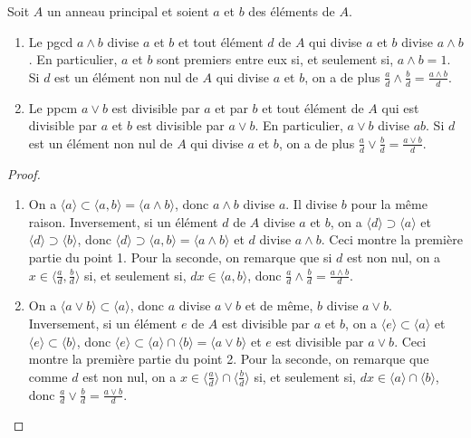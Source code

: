 \documentclass[]{report}
\begin{document}
\begin{prop}{}{}
    Soit $A$ un anneau principal et soient $a$ et $b$ des éléments de $A$.
    \begin{enumerate}
        \item Le pgcd $a \wedge b$ divise $a$ et $b$ et tout élément $d$ de $A$ qui divise $a$ et $b$ divise $a \wedge b$. En particulier, $a$ et $b$ sont premiers entre eux si, et seulement si, $a \wedge b = 1$. Si $d$ est un élément non nul de $A$ qui divise $a$ et $b$, on a de plus $\frac{a}{d} \wedge \frac{b}{d} = \frac{a \wedge b}{d}$.
        \item Le ppcm $a \vee b$ est divisible par $a$ et par $b$ et tout élément de $A$ qui est divisible par $a$ et $b$ est divisible par $a \vee b$. En particulier, $a \vee b$ divise $ab$. Si $d$ est un élément non nul de $A$ qui divise $a$ et $b$, on a de plus $\frac{a}{d} \vee \frac{b}{d} = \frac{a \vee b}{d}$.
    \end{enumerate}
\end{prop}

\begin{proof}
    \begin{enumerate}
        \item On a $\langle a \rangle \subset \langle a, b \rangle = \langle a \wedge b \rangle$, donc $a \wedge b$ divise $a$. Il divise $b$ pour la même raison. Inversement, si un élément $d$ de $A$ divise $a$ et $b$, on a $\langle d \rangle \supset \langle a \rangle$ et $\langle d \rangle \supset \langle b \rangle$, donc $\langle d \rangle \supset \langle a, b \rangle = \langle a \wedge b \rangle$ et $d$ divise $a \wedge b$. Ceci montre la première partie du point 1. Pour la seconde, on remarque que si $d$ est non nul, on a $x \in \langle \frac{a}{d}, \frac{b}{d} \rangle$ si, et seulement si, $dx \in \langle a, b \rangle$, donc $\frac{a}{d} \wedge \frac{b}{d} = \frac{a \wedge b}{d}$.
        \item On a $\langle a \vee b \rangle \subset \langle a \rangle$, donc $a$ divise $a \vee b$ et de même, $b$ divise $a \vee b$. Inversement, si un élément $e$ de $A$ est divisible par $a$ et $b$, on a $\langle e \rangle \subset \langle a \rangle$ et $\langle e \rangle \subset \langle b \rangle$, donc $\langle e \rangle \subset \langle a \rangle \cap \langle b \rangle = \langle a \vee b \rangle$ et $e$ est divisible par $a \vee b$. Ceci montre la première partie du point 2. Pour la seconde, on remarque que comme $d$ est non nul, on a $x \in \langle \frac{a}{d} \rangle \cap \langle \frac{b}{d} \rangle$ si, et seulement si, $dx \in \langle a \rangle \cap \langle b \rangle$, donc $\frac{a}{d} \vee \frac{b}{d} = \frac{a \vee b}{d}$.
    \end{enumerate}
\end{proof}
\end{document}
